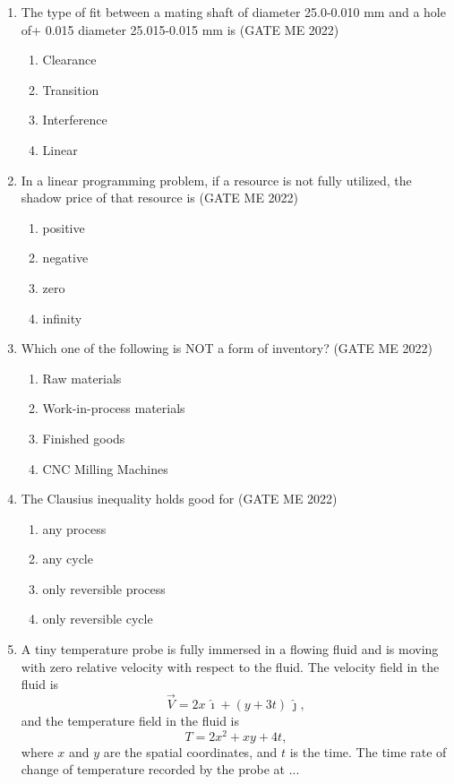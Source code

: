 \documentclass[journal]{IEEEtran}
\numberwithin{equation}{enumi}
\numberwithin{figure}{enumi}
\begin{document}
\begin{enumerate}
\item The type of fit between a mating shaft of diameter 25.0-0.010 mm and a hole of+ 0.015 diameter 25.015-0.015 mm is
\hfill{(GATE ME 2022)}
\begin{multicols}{4}
    \begin{enumerate}
        \item Clearance
  \item Transition
\item Interference
\item Linear
\end{enumerate}
\end{multicols}

\item In a linear programming problem, if a resource is not fully utilized, the shadow price of that resource is
\hfill{(GATE ME 2022)}
\begin{multicols}{4}
    \begin{enumerate}
        \item positive
        \item negative
        \item zero
        \item infinity
    \end{enumerate}
\end{multicols}

\item Which one of the following is NOT a form of inventory?
\hfill{(GATE ME 2022)}
\begin{multicols}{2}
    \begin{enumerate}
        \item Raw materials
\item Work-in-process materials
\item Finished goods
\item CNC Milling Machines
    \end{enumerate}
\end{multicols}
\item 
The Clausius inequality holds good for
\hfill{(GATE ME 2022)}
\begin{multicols}{2}
    \begin{enumerate}
        \item any process
        \item any cycle
        \item only reversible process
        \item only reversible cycle
    \end{enumerate}
\end{multicols}
  \item A tiny temperature probe is fully immersed in a flowing fluid and is moving with zero relative velocity with respect to the fluid. The velocity field in the fluid is 
    \[
    \vec{V} = 2x\, \hat{\imath} + (y + 3t)\, \hat{\jmath},
    \]
    and the temperature field in the fluid is 
    \[
    T = 2x^2 + xy + 4t,
    \]
    where \(x\) and \(y\) are the spatial coordinates, and \(t\) is the time. The time rate of change of temperature recorded by the probe at ...


\end{enumerate}
\end{document}
